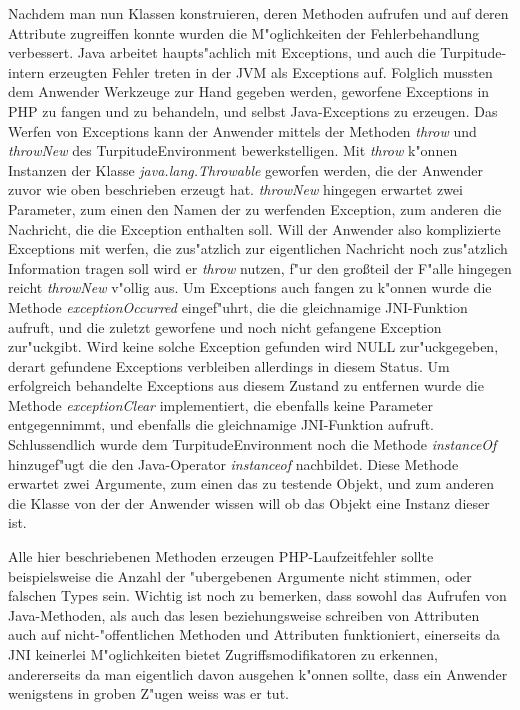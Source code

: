 Nachdem man nun Klassen konstruieren, deren Methoden aufrufen und auf deren Attribute zugreiffen konnte wurden die M"oglichkeiten der Fehlerbehandlung
verbessert. Java arbeitet haupts"achlich mit Exceptions, und auch die Turpitude-intern erzeugten Fehler treten in der JVM als Exceptions auf. Folglich mussten dem
Anwender Werkzeuge zur Hand gegeben werden, geworfene Exceptions in PHP zu fangen und zu behandeln, und selbst Java-Exceptions zu erzeugen. Das Werfen von
Exceptions kann der Anwender mittels der Methoden \emph{throw} und \emph{throwNew} des TurpitudeEnvironment bewerkstelligen. Mit \emph{throw} k"onnen Instanzen
der Klasse \emph{java.lang.Throwable} geworfen werden, die der Anwender zuvor wie oben beschrieben erzeugt hat. \emph{throwNew} hingegen erwartet zwei Parameter,
zum einen den Namen der zu werfenden Exception, zum anderen die Nachricht, die die Exception enthalten soll. Will der Anwender also komplizierte Exceptions mit
werfen, die zus"atzlich zur eigentlichen Nachricht noch zus"atzlich Information tragen soll wird er \emph{throw} nutzen, f"ur den gro\ss teil der F"alle 
hingegen reicht \emph{throwNew} v"ollig aus. Um Exceptions auch fangen zu k"onnen wurde die Methode \emph{exceptionOccurred} eingef"uhrt, die die gleichnamige
JNI-Funktion aufruft, und die zuletzt geworfene und noch nicht gefangene Exception zur"uckgibt. Wird keine solche Exception gefunden wird NULL zur"uckgegeben,
derart gefundene Exceptions verbleiben allerdings in diesem Status. Um erfolgreich behandelte Exceptions aus diesem Zustand zu entfernen wurde die Methode
\emph{exceptionClear} implementiert, die ebenfalls keine Parameter entgegennimmt, und ebenfalls die gleichnamige JNI-Funktion aufruft.
Schlussendlich wurde dem TurpitudeEnvironment noch die Methode \emph{instanceOf} hinzugef"ugt die den Java-Operator \emph{instanceof} nachbildet.
Diese Methode erwartet zwei Argumente, zum einen das zu testende Objekt, und zum anderen die Klasse von der der Anwender wissen will ob das Objekt eine Instanz
dieser ist.

Alle hier beschriebenen Methoden erzeugen PHP-Laufzeitfehler sollte beispielsweise die Anzahl der "ubergebenen Argumente nicht stimmen, oder falschen Types sein.
Wichtig ist noch zu bemerken, dass sowohl das Aufrufen von Java-Methoden, als auch das lesen beziehungsweise schreiben von Attributen auch auf nicht-"offentlichen
Methoden und Attributen funktioniert, einerseits da JNI keinerlei M"oglichkeiten bietet Zugriffsmodifikatoren zu erkennen, andererseits da man eigentlich davon
ausgehen k"onnen sollte, dass ein Anwender wenigstens in groben Z"ugen weiss was er tut. 

